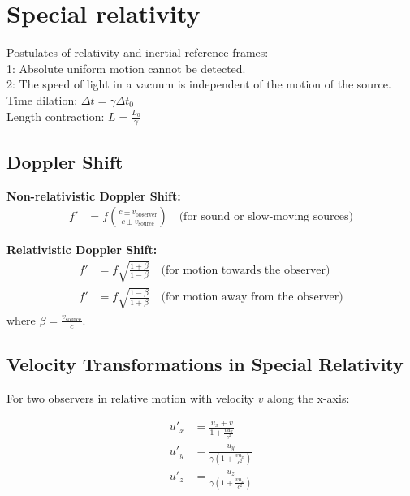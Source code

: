 \documentclass[12pt,a4paper]{article}
\begin{document}
	\section*{Special relativity}
	Postulates of relativity and inertial reference frames:\\
	1: Absolute uniform motion cannot be detected.\\
	2: The speed of light in a vacuum is independent of the motion of the source.\\
	
	Time dilation: \( \Delta t = \gamma \Delta t_0\) \\
	
	Length contraction: \( L = \frac{L_0}{\gamma}\) \\
	
	\subsection*{Doppler Shift}
	
	\textbf{Non-relativistic Doppler Shift:}
	\begin{align}
		f' &= f \left( \frac{c \pm v_{\text{observer}}}{c \pm v_{\text{source}}} \right) \quad \text{(for sound or slow-moving sources)}
	\end{align}
	
	\textbf{Relativistic Doppler Shift:}
	\begin{align}
		f' &= f \sqrt{\frac{1 + \beta}{1 - \beta}} \quad \text{(for motion towards the observer)} \\
		f' &= f \sqrt{\frac{1 - \beta}{1 + \beta}} \quad \text{(for motion away from the observer)}
	\end{align}
	where \( \beta = \frac{v_{\text{source}}}{c} \).
	
	\subsection*{Velocity Transformations in Special Relativity}
	
	For two observers in relative motion with velocity \( v \) along the x-axis:
	
	\begin{align}
		u'_{x} &= \frac{u_{x} + v}{1 + \frac{vu_{x}}{c^2}} \\
		u'_{y} &= \frac{u_{y}}{\gamma(1 + \frac{vu_{x}}{c^2})} \\
		u'_{z} &= \frac{u_{z}}{\gamma(1 + \frac{vu_{x}}{c^2})}
	\end{align}
	
\end{document}
